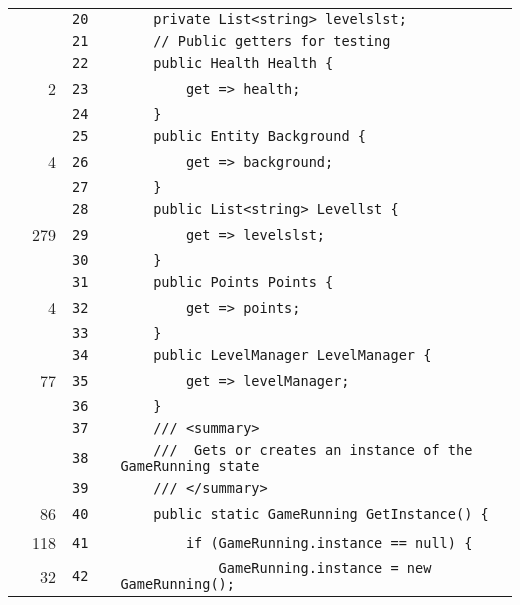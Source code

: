 \documentclass[a4paper,landscape,10pt]{article}
\begin{document}
\begin{longtable}[l]{lrrll}
\cellcolor{gray} &  & \verb~20~ & & \verb~    private List<string> levelslst;~\\
\cellcolor{gray} &  & \verb~21~ & & \verb~    // Public getters for testing~\\
\cellcolor{gray} &  & \verb~22~ & & \verb~    public Health Health {~\\
\cellcolor{green} & 2 & \verb~23~ & & \verb~        get => health;~\\
\cellcolor{gray} &  & \verb~24~ & & \verb~    }~\\
\cellcolor{gray} &  & \verb~25~ & & \verb~    public Entity Background {~\\
\cellcolor{green} & 4 & \verb~26~ & & \verb~        get => background;~\\
\cellcolor{gray} &  & \verb~27~ & & \verb~    }~\\
\cellcolor{gray} &  & \verb~28~ & & \verb~    public List<string> Levellst {~\\
\cellcolor{green} & 279 & \verb~29~ & & \verb~        get => levelslst;~\\
\cellcolor{gray} &  & \verb~30~ & & \verb~    }~\\
\cellcolor{gray} &  & \verb~31~ & & \verb~    public Points Points {~\\
\cellcolor{green} & 4 & \verb~32~ & & \verb~        get => points;~\\
\cellcolor{gray} &  & \verb~33~ & & \verb~    }~\\
\cellcolor{gray} &  & \verb~34~ & & \verb~    public LevelManager LevelManager {~\\
\cellcolor{green} & 77 & \verb~35~ & & \verb~        get => levelManager;~\\
\cellcolor{gray} &  & \verb~36~ & & \verb~    }~\\
\cellcolor{gray} &  & \verb~37~ & & \verb~    /// <summary>~\\
\cellcolor{gray} &  & \verb~38~ & & \verb~    ///  Gets or creates an instance of the GameRunning state~\\
\cellcolor{gray} &  & \verb~39~ & & \verb~    /// </summary>~\\
\cellcolor{green} & 86 & \verb~40~ & & \verb~    public static GameRunning GetInstance() {~\\
\cellcolor{green} & 118 & \verb~41~ & & \verb~        if (GameRunning.instance == null) {~\\
\cellcolor{green} & 32 & \verb~42~ & & \verb~            GameRunning.instance = new GameRunning();~\\

\end{longtable}
\end{document}

